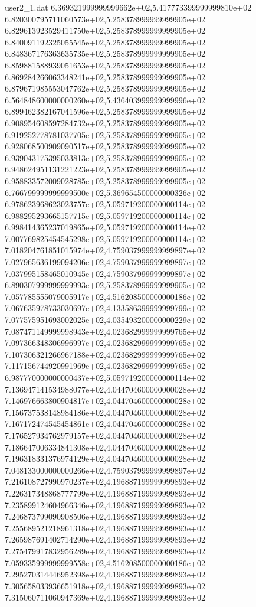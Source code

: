 \begin{filecontents}{user2_1.dat}
6.369321999999999662e+02,5.417773399999999810e+02
6.820300795711060573e+02,5.258378999999999905e+02
6.829613923529411750e+02,5.258378999999999905e+02
6.840091192325055545e+02,5.258378999999999905e+02
6.848367176363635735e+02,5.258378999999999905e+02
6.859881588939051653e+02,5.258378999999999905e+02
6.869284266063348241e+02,5.258378999999999905e+02
6.879671985553047762e+02,5.258378999999999905e+02
6.564848600000000260e+02,5.436403999999999996e+02
6.899462382167041596e+02,5.258378999999999905e+02
6.908954608597284732e+02,5.258378999999999905e+02
6.919252778781037705e+02,5.258378999999999905e+02
6.928068500909090517e+02,5.258378999999999905e+02
6.939043175395033813e+02,5.258378999999999905e+02
6.948624951131221223e+02,5.258378999999999905e+02
6.958833572009028785e+02,5.258378999999999905e+02
6.766799999999999500e+02,5.369654500000000326e+02
6.978623968623023757e+02,5.059719200000000114e+02
6.988295293665157715e+02,5.059719200000000114e+02
6.998414365237019865e+02,5.059719200000000114e+02
7.007769825454545298e+02,5.059719200000000114e+02
7.018204761851015974e+02,4.759037999999999897e+02
7.027965636199094206e+02,4.759037999999999897e+02
7.037995158465010945e+02,4.759037999999999897e+02
6.890307999999999993e+02,5.258378999999999905e+02
7.057785555079005917e+02,4.516208500000000186e+02
7.067635978733030697e+02,4.133586399999999799e+02
7.077575951693002025e+02,4.035493200000000229e+02
7.087471149999998943e+02,4.023682999999999765e+02
7.097366348306996997e+02,4.023682999999999765e+02
7.107306321266967188e+02,4.023682999999999765e+02
7.117156744920991969e+02,4.023682999999999765e+02
6.987770000000000437e+02,5.059719200000000114e+02
7.136947141534988077e+02,4.044704600000000028e+02
7.146976663800904817e+02,4.044704600000000028e+02
7.156737538148984186e+02,4.044704600000000028e+02
7.167172474545454861e+02,4.044704600000000028e+02
7.176527934762979157e+02,4.044704600000000028e+02
7.186647006334841308e+02,4.044704600000000028e+02
7.196318331376974129e+02,4.044704600000000028e+02
7.048133000000000266e+02,4.759037999999999897e+02
7.216108727990970237e+02,4.196887199999999893e+02
7.226317348868777799e+02,4.196887199999999893e+02
7.235899124604966346e+02,4.196887199999999893e+02
7.246873799090908506e+02,4.196887199999999893e+02
7.255689521218961318e+02,4.196887199999999893e+02
7.265987691402714290e+02,4.196887199999999893e+02
7.275479917832956289e+02,4.196887199999999893e+02
7.059335999999999558e+02,4.516208500000000186e+02
7.295270314446952398e+02,4.196887199999999893e+02
7.305658033936651918e+02,4.196887199999999893e+02
7.315060711060947369e+02,4.196887199999999893e+02

\end{filecontents}
